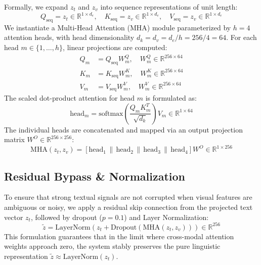 \documentclass[10pt,journal,compsoc]{IEEEtran}
\begin{document}
Formally, we expand $z_t$ and $z_v$ into sequence representations of unit length:
\begin{equation}
    Q_{\text{seq}} = z_t \in \mathbb{R}^{1 \times d_e}, \quad K_{\text{seq}} = z_v \in \mathbb{R}^{1 \times d_e}, \quad V_{\text{seq}} = z_v \in \mathbb{R}^{1 \times d_e}
\end{equation}
We instantiate a Multi-Head Attention (MHA) module \cite{vaswani2017attention} parameterized by $h = 4$ attention heads, with head dimensionality $d_k = d_v = d_e / h = 256 / 4 = 64$. For each head $m \in \{1, \dots, h\}$, linear projections are computed:
\begin{align}
    Q_m &= Q_{\text{seq}} W_m^Q, \quad W_m^Q \in \mathbb{R}^{256 \times 64} \\
    K_m &= K_{\text{seq}} W_m^K, \quad W_m^K \in \mathbb{R}^{256 \times 64} \\
    V_m &= V_{\text{seq}} W_m^V, \quad W_m^V \in \mathbb{R}^{256 \times 64}
\end{align}
The scaled dot-product attention for head $m$ is formulated as:
\begin{equation}
    \text{head}_m = \text{softmax}\left(\frac{Q_m K_m^T}{\sqrt{d_k}}\right) V_m \in \mathbb{R}^{1 \times 64}
\end{equation}
The individual heads are concatenated and mapped via an output projection matrix $W^O \in \mathbb{R}^{256 \times 256}$:
\begin{equation}
    \text{MHA}(z_t, z_v) = \left[ \text{head}_1 \,\|\, \text{head}_2 \,\|\, \text{head}_3 \,\|\, \text{head}_4 \right] W^O \in \mathbb{R}^{1 \times 256}
\end{equation}

\subsection{Residual Bypass \& Normalization}
To ensure that strong textual signals are not corrupted when visual features are ambiguous or noisy, we apply a residual skip connection from the projected text vector $z_t$, followed by dropout ($p=0.1$) and Layer Normalization:
\begin{equation}
    \tilde{z} = \text{LayerNorm}\left(z_t + \text{Dropout}(\text{MHA}(z_t, z_v))\right) \in \mathbb{R}^{256}
\end{equation}
This formulation guarantees that in the limit where cross-modal attention weights approach zero, the system stably preserves the pure linguistic representation $\tilde{z} \approx \text{LayerNorm}(z_t)$.
\end{document}
